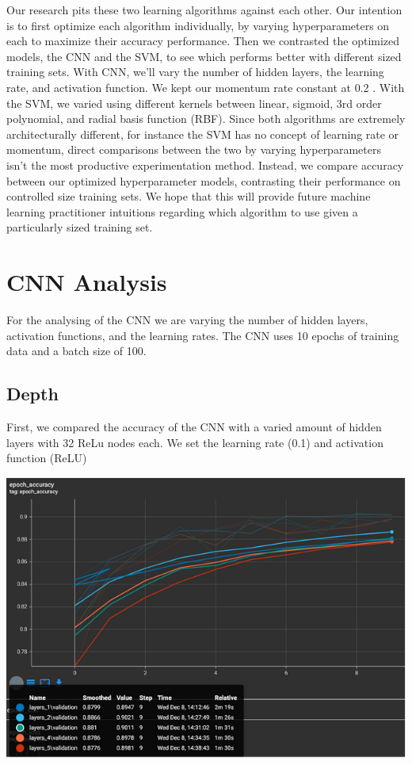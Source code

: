 \documentclass[12pt]{article}
\begin{document}
Our research pits these two learning algorithms against each other. Our intention is to first optimize each algorithm individually, by varying hyperparameters on each to maximize their accuracy performance. Then we contrasted the optimized models, the CNN and the SVM, to see which performs better with different sized training sets. With CNN, we’ll vary the number of hidden layers, the learning rate, and activation function. We kept our momentum rate constant at 0.2 . With the SVM, we varied using different kernels between linear, sigmoid, 3rd order polynomial, and radial basis function (RBF). Since both algorithms are extremely architecturally different, for instance the SVM has no concept of learning rate or momentum, direct comparisons between the two by varying hyperparameters isn’t the most productive experimentation method. Instead, we compare accuracy between our optimized hyperparameter models, contrasting their performance on controlled size training sets. We hope that this will provide future machine learning practitioner intuitions regarding which algorithm to use given a particularly sized training set.

\section{CNN Analysis}

For the analysing of the CNN we are varying the number of hidden layers, activation functions, and the learning rates. The CNN uses 10 epochs of training data and a batch size of 100. 

\subsection{Depth}

First, we compared the accuracy of the CNN with a varied amount of hidden layers with 32 ReLu nodes each. We set the learning rate (0.1) and activation function (ReLU)

\includegraphics[scale=.75]{cnngraph1.PNG}
\end{document}
